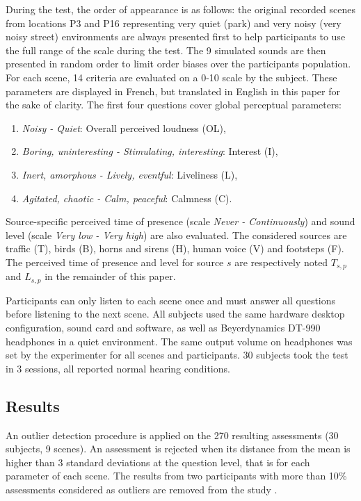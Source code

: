 \documentclass{article}
\begin{document}
\begin{sloppy}
During the test, the order of appearance is as follows: the original recorded scenes from locations P3 and P16 representing very quiet (park) and very noisy (very noisy street) environments are always presented first to help participants to use the full range of the scale during the test. The 9 simulated sounds are then presented in random order to limit order biases over the participants population. For each scene, 14 criteria are evaluated on a 0-10 scale by the subject. These parameters are displayed in French, but translated in English in this paper for the sake of clarity. The first four questions cover global perceptual parameters:
\begin{enumerate}
\item \textit{Noisy - Quiet}: Overall perceived loudness (OL),
\item \textit{Boring, uninteresting - Stimulating, interesting}: Interest (I),
\item \textit{Inert, amorphous - Lively, eventful}: Liveliness (L),
\item \textit{Agitated, chaotic - Calm, peaceful}: Calmness (C).
\end{enumerate}
Source-specific perceived time of presence (scale \textit{Never - Continuously}) and sound level (scale \textit{Very low - Very high}) are also evaluated. The considered sources are traffic (T), birds (B), horns and sirens (H), human voice (V) and footsteps (F). The perceived time of presence and level for source $s$ are respectively noted $T_{s,p}$ and $L_{s,p}$ in the remainder of this paper.

Participants can only listen to each scene once and must answer all questions before listening to the next scene. All subjects used the same hardware desktop configuration, sound card and software, as well as Beyerdynamics DT-990 headphones in a quiet environment. The same output volume on headphones was set by the experimenter for all scenes and participants. 30 subjects took the test in 3 sessions, all reported normal hearing conditions.

\subsection{Results}


An outlier detection procedure is applied on the 270 resulting assessments (30 subjects, 9 scenes). An assessment is rejected when its distance from the mean is higher than 3 standard deviations at the question level, that is for each parameter of each scene. The results from two participants with more than 10\% assessments considered as outliers are removed from the study%
.


\end{sloppy}
\end{document}
